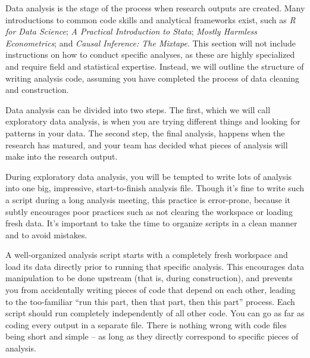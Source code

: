 Data analysis is the stage of the process when research outputs are created. 
Many introductions to common code skills and analytical frameworks exist, such as
\textit{R for Data Science};
\textit{A Practical Introduction to Stata};
\textit{Mostly Harmless Econometrics}; and
\textit{Causal Inference: The Mixtape}.
This section will not include instructions on how to conduct specific analyses,
as these are highly specialized and require field and statistical expertise.
Instead, we will outline the structure of writing analysis code,
assuming you have completed the process of data cleaning and construction.

Data analysis can be divided into two steps. 
The first, which we will call exploratory data analysis, 
is when you are trying different things and looking for patterns in your data. 
The second step, the final analysis,
happens when the research has matured,
and your team has decided what pieces of analysis will make into the research output.

During exploratory data analysis,
you will be tempted to write lots of analysis 
into one big, impressive, start-to-finish analysis file. 
Though it's fine to write such a script during a long analysis meeting, 
this practice is error-prone, 
because it subtly encourages poor practices such as 
not clearing the workspace or loading fresh data. 
It's important to take the time to organize scripts in a clean manner and to avoid mistakes.

A well-organized analysis script starts with 
a completely fresh workspace and load its data directly
prior to running that specific analysis.
This encourages data manipulation to be done upstream (that is, during construction),
and prevents you from accidentally writing pieces of code
that depend on each other, leading to the too-familiar
``run this part, then that part, then this part'' process.
Each script should run completely independently of all other code.
You can go as far as coding every output in a separate file.
There is nothing wrong with code files being short and simple --
as long as they directly correspond to specific pieces of analysis.

